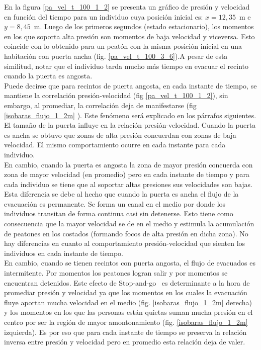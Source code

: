 En la figura \ref{pa_vel_t_100_1_2} se presenta un gráfico de presión y velocidad en función del tiempo para un individuo cuya posición inicial es: $x=12,35$~m e $y=8,45$~m. Luego de los primeros segundos (estado estacionario), los momentos en los que soporta alta presión son momentos de baja velocidad y viceversa. Esto coincide con lo obtenido para un peatón con la misma posición inicial en una habitación con puerta ancha (fig. \ref{pa_vel_t_100_3_6}).A pesar de esta similitud, notar que el individuo tarda mucho más tiempo en evacuar el recinto cuando la puerta es angosta. \\

Puede decirse que para recintos de puerta angosta, en cada instante de tiempo, se mantiene la correlación presión-velocidad (fig \ref{pa_vel_t_100_1_2}), sin embargo, al promediar, la correlación deja de manifestarse (fig \ref{isobaras_flujo_1_2m} ). Este fenómeno será explicado en los párrafos siguientes. \\
El tamaño de la puerta influye en la relación presión-velocidad. Cuando la puerta es ancha se obtuvo que zonas de alta presión concuerdan con zonas de baja velocidad. El mismo comportamiento ocurre en cada instante para cada individuo. \\

En cambio, cuando la puerta es angosta la zona de mayor presión concuerda con zona de mayor velocidad (en promedio) pero en cada instante de tiempo y para cada individuo se tiene que al soportar altas presiones sus velocidades son bajas. \\
Esta diferencia se debe al hecho que cuando la puerta es ancha el flujo de la evacuación es permanente. Se forma un canal en el medio por donde los individuos transitan de forma continua casi sin detenerse. Esto tiene como consecuencia que la mayor velocidad se de en el medio y estimula la acumulación de peatones en los costados (formando focos de alta presión en dicha zona). No hay diferencias en cuanto al comportamiento presión-velocidad que sienten los individuos en cada instante de tiempo.\\

En cambio, cuando se tienen recintos con puerta angosta, el flujo de evacuados es intermitente. Por momentos los peatones logran salir y por momentos se encuentran detenidos. Este efecto de Stop-and-go~\cite{stop-go} es determinante a la hora de promediar presión y velocidad ya que los momentos en los cuales la evacuación fluye aportan mucha velocidad en el medio (fig. \ref{isobaras_flujo_1_2m} derecha) y los momentos en los que las personas están quietas suman mucha presión en el centro por ser la región de mayor amontonamiento (fig. \ref{isobaras_flujo_1_2m} izquierda). Es por eso que para cada instante de tiempo se preserva la relación inversa entre presión y velocidad pero en promedio esta relación deja de valer.

